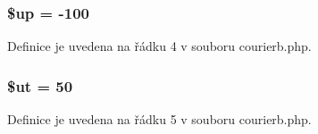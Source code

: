 \hypertarget{courierb_8php_a6b5ad2ac55f9df46e8f34e78fbd6f176}{
\subsubsection[{\$up}]{\setlength{\rightskip}{0pt plus 5cm}\$up = -\/100}}\label{courierb_8php_a6b5ad2ac55f9df46e8f34e78fbd6f176}


Definice je uvedena na řádku 4 v souboru courierb.\-php.

\hypertarget{courierb_8php_aadd3f841051043ee58e587e840e8dd0b}{
\subsubsection[{\$ut}]{\setlength{\rightskip}{0pt plus 5cm}\$ut = 50}}\label{courierb_8php_aadd3f841051043ee58e587e840e8dd0b}


Definice je uvedena na řádku 5 v souboru courierb.\-php.

